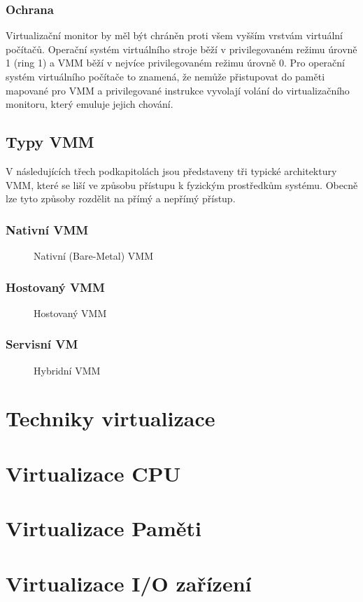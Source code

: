\subsubsection*{Ochrana}

Virtualizační monitor by měl být chráněn proti všem vyšším vrstvám virtuální počítačů. Operační systém virtuálního stroje běží v privilegovaném režimu úrovně 1 (ring 1) a VMM běží v nejvíce privilegovaném režimu úrovně 0.
Pro operační systém virtuálního počítače to znamená, že nemůže přistupovat do paměti mapované pro VMM a privilegované instrukce vyvolají volání do virtualizačního monitoru, který emuluje jejich chování. 


\subsection{Typy VMM}

V následujících třech podkapitolách jsou představeny tři typické architektury VMM, které se liší ve způsobu přístupu k fyzickým prostředkům systému. Obecně lze tyto způsoby rozdělit na přímý a nepřímý přístup.

\subsubsection*{Nativní VMM}

\begin{figure}
    \centering    
    \caption{Nativní (Bare-Metal) VMM}
    \label{native_vmm}
\end{figure}

\subsubsection*{Hostovaný VMM}

\begin{figure}
    \centering    
    \caption{Hostovaný VMM}
    \label{hosted_vmm}
\end{figure}

\subsubsection*{Servisní VM}

\begin{figure}
    \centering    
    \caption{Hybridní VMM}
    \label{hybrid_vmm}
\end{figure}

\section{Techniky virtualizace}
\label{virt_techniques}



\section{Virtualizace CPU}
\section{Virtualizace Paměti}
\section{Virtualizace I/O zařízení}


